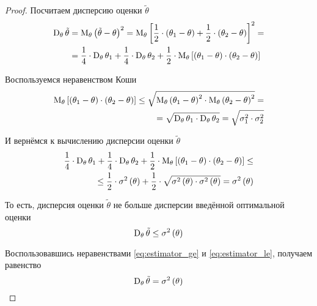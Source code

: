 \begin{proof}
  Посчитаем дисперсию оценки $\tilde{\theta}$
  \begin{align*}
  \operatorname{D}_{\theta} \tilde{\theta}
    &=\operatorname{M}_{\theta} \left( \tilde{\theta}-\theta \right)^2
    =\operatorname{M}_{\theta} \left[ \frac{1}{2}\cdot\left( \theta_1-\theta \right)
      +\frac{1}{2}\cdot\left( \theta_2-\theta \right) \right]^2=\\
    &=\frac{1}{4}\cdot\operatorname{D}_{\theta} \theta_1
      +\frac{1}{4}\cdot\operatorname{D}_{\theta} \theta_2
      +\frac{1}{2}\cdot\operatorname{M}_{\theta} \left[ \left( \theta_1-\theta \right)
          \cdot\left( \theta_2-\theta \right) \right]
  \end{align*}

  Воспользуемся неравенством Коши%
  \begin{eqnarray}\label{eq:koshi_eq}
    \operatorname{M}_{\theta} \left[ \left( \theta_1-\theta \right)
      \cdot\left( \theta_2-\theta \right) \right]
    \le\sqrt{\operatorname{M}_{\theta} \left( \theta_1-\theta \right)^2
      \cdot\operatorname{M}_{\theta} \left( \theta_2-\theta \right)^2}=\\
    =\sqrt{\operatorname{D}_{\theta} \theta_1
      \cdot\operatorname{D}_{\theta} \theta_2}
    =\sqrt{\sigma_1^2\cdot\sigma_2^2}\nonumber
  \end{eqnarray}
    
  И вернёмся к вычислению дисперсии оценки $\tilde{\theta}$
  \begin{align*}
    \frac{1}{4}\cdot\operatorname{D}_{\theta} \theta_1
      +\frac{1}{4}\cdot\operatorname{D}_{\theta} \theta_2
      +\frac{1}{2}\cdot\operatorname{M}_{\theta} \left[ \left( \theta_1-\theta \right)
          \cdot\left( \theta_2-\theta \right) \right]\le\\
    \le\frac{1}{2}\cdot\sigma^2\left( \theta \right)
      +\frac{1}{2}\cdot\sqrt{\sigma^2\left( \theta \right)
        \cdot\sigma^2\left( \theta \right)}
    =\sigma^2\left( \theta \right)
  \end{align*}

  То есть, дисперсия оценки $\tilde{\theta}$ не больше дисперсии
  введённой оптимальной оценки
  \begin{equation}\label{eq:estimator_le}
    \operatorname{D}_{\theta} \tilde{\theta}\le\sigma^2\left(\theta\right)
  \end{equation}

  Воспользовавшись неравенствами
  \eqref{eq:estimator_ge} и \eqref{eq:estimator_le}, получаем равенство
  $$\operatorname{D}_{\theta} \tilde{\theta}=\sigma^2\left(\theta\right)$$


\end{proof}
